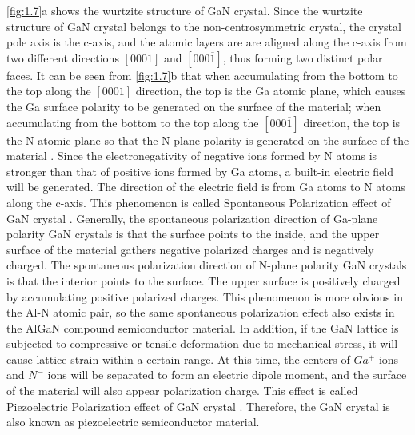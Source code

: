 \autoref{fig:1.7}a shows the wurtzite  structure of GaN  crystal. Since the wurtzite structure of GaN crystal  belongs to the non-centrosymmetric crystal, the crystal pole axis is the c-axis, and the atomic layers are are aligned along the c-axis from two different directions $[0001]$ and $[000\overline{1}]$, thus forming two distinct polar faces. It can be seen from \autoref{fig:1.7}b that when accumulating from the bottom to the top along the $[0001]$ direction, the top is the Ga atomic plane, which causes the Ga surface  polarity to be generated on the surface of the material; when accumulating from the bottom to the top along the $[000\overline{1}]$ direction, the top is the N atomic plane so that the N-plane polarity is generated on the surface of the material \cite{hellman1998polarity}. Since the electronegativity  of negative ions formed by N atoms is stronger than that of positive ions formed by Ga atoms, a built-in electric field  will be generated. The direction of the electric field is from Ga atoms to N atoms along the c-axis. This phenomenon is called Spontaneous  Polarization  effect of GaN crystal \cite{sacconi2001spontaneous,yu1999spontaneous}. Generally, the spontaneous polarization direction of Ga-plane polarity GaN crystals is that the surface points to the inside, and the upper surface of the material gathers negative polarized charges and is negatively charged. The spontaneous polarization  direction of N-plane polarity GaN crystals  is that the interior points to the surface. The upper surface  is positively charged by accumulating positive polarized charges. This phenomenon is more obvious in the Al-N atomic pair, so the same spontaneous polarization effect also exists in the AlGaN compound semiconductor material. In addition, if the GaN lattice is subjected to compressive or tensile deformation  due to mechanical stress, it will cause lattice strain  within a certain range. At this time, the centers of $Ga^{+}$ ions and $N^{-}$ ions will be separated to form an  electric dipole moment, and the surface  of the material will also appear polarization  charge. This effect is called Piezoelectric Polarization  effect of GaN crystal \cite{sacconi2001spontaneous,yu1999spontaneous}. Therefore, the  GaN crystal is also known as piezoelectric semiconductor material.

